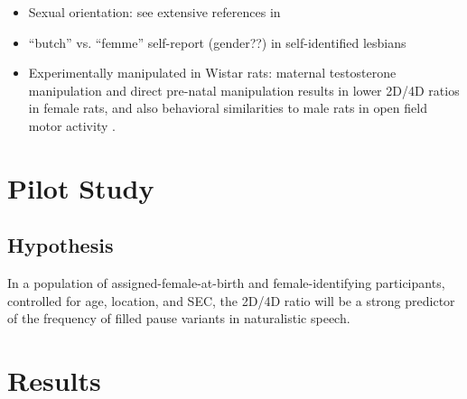 \documentclass[a0,portrait]{a0poster}
\begin{document}
\begin{multicols}{2}

\begin{itemize}
	\item Sexual orientation: see extensive references in \citet{balthazart2011}
	\item ``butch'' vs. ``femme'' self-report (gender??) in self-identified lesbians \citep{brownetal2002}
	\item Experimentally manipulated in Wistar rats: maternal testosterone manipulation and direct pre-natal manipulation results in lower 2D/4D ratios in female rats, and also behavioral similarities to male rats in open field motor activity \citep{talarovicovaetal2009}.
\end{itemize}


\section*{Pilot Study}

\subsection{Hypothesis}

In a population of assigned-female-at-birth and female-identifying participants, controlled for age, location, and SEC, the 2D/4D ratio will be a strong predictor of the frequency of filled pause variants in naturalistic speech.




\section*{Results}


\end{multicols}
\end{document}
